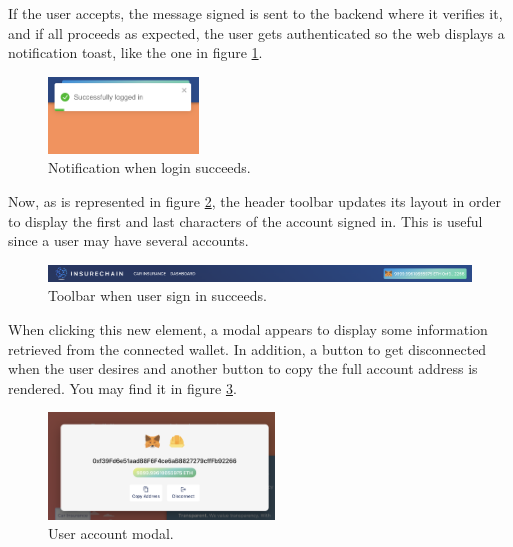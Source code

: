 {If the user accepts, the message signed is sent to the backend where it verifies it, and if all proceeds as expected, the user gets authenticated so the web displays a notification toast, like the one in figure \ref{fig:auth-success-notification}.

\begin{figure}[H]
\centering
\includegraphics[width=4cm]{img/results/auth-success-notification.png}
\caption[Insurechain: Notification when login succeeds ]{\footnotesize{Notification when login succeeds.}}
\label{fig:auth-success-notification}
\end{figure}

Now, as is represented in figure \ref{fig:header-signed-in}, the header toolbar updates its layout in order to display the first and last characters of the account signed in. This is useful since a user may have several accounts.

\begin{figure}[H]
\centering
\includegraphics[width=12cm]{img/results/header-signedIn.png}
\caption[Insurechain: Header when user sign in succeeds ]{\footnotesize{Toolbar when user sign in succeeds.}}
\label{fig:header-signed-in}
\end{figure}

When clicking this new element, a modal appears to display some information retrieved from the connected wallet. In addition, a button to get disconnected when the user desires and another button to copy the full account address is rendered. You may find it in figure \ref{fig:signed-in-modal}.

\begin{figure}[H]
\centering
\includegraphics[width=6cm]{img/results/auth-signed-in-modal.png}
\caption[Insurechain: User account modal ]{\footnotesize{User account modal.}}
\label{fig:signed-in-modal}
\end{figure}
}

